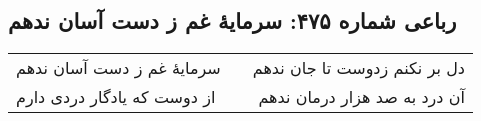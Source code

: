 \begin{center}
\section*{رباعی شماره ۴۷۵: سرمایهٔ غم ز دست آسان ندهم}
\label{sec:sh475}
\begin{longtable}{l p{0.5cm} r}
سرمایهٔ غم ز دست آسان ندهم
&&
دل بر نکنم زدوست تا جان ندهم
\\
از دوست که یادگار دردی دارم
&&
آن درد به صد هزار درمان ندهم
\\
\end{longtable}
\end{center}
